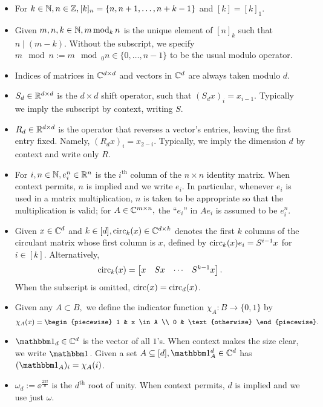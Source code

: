 \begin{itemize}
\item For $k \in \mathbb{N}, n \in \mathbb{Z}, [k]_n = \{n, n + 1, \ldots, n + k - 1\}$ and $[k] = [k]_1$.
\item Given $m, n, k \in \mathbb{N}, m \operatorname{\mathbin{mod}}_k n$ is the unique element of $[n]_k$ such that $n \mid (m - k)$.  Without the subscript, we specify $m \mod n := m \mod_0 n \in \{0, \ldots, n - 1\}$ to be the usual modulo operator.
\item Indices of matrices in $\mathbb{C}^{d \times d}$ and vectors in $\mathbb{C}^d$ are always taken modulo $d$.
\item $S_d \in \mathbb{R}^{d \times d}$ is the $d \times d$ shift operator, such that $(S_d x)_i = x_{i - 1}$.  Typically we imply the subscript by context, writing $S$.
\item $R_d \in \mathbb{R}^{d \times d}$ is the operator that reverses a vector's entries, leaving the first entry fixed.  Namely, $(R_d x)_i = x_{2 - i}$.  Typically, we imply the dimension $d$ by context and write only $R$.
\item For $i, n \in \mathbb{N}, e_i^n \in \mathbb{R}^n$ is the $i^{\text{th}}$ column of the $n \times n$ identity matrix.  When context permits, $n$ is implied and we write $e_i$.  In particular, whenever $e_i$ is used in a matrix multiplication, $n$ is taken to be appropriate so that the multiplication is valid; for $A \in \mathbb{C}^{m \times n},$ the ``$e_i$'' in $A e_i$ is assumed to be $e_i^n$.
\item Given $x \in \mathbb{C}^d$ and $k \in [d], \operatorname{circ}_k(x) \in \mathbb{C}^{d \times k}$ denotes the first $k$ columns of the circulant matrix whose first column is $x$, defined by $\operatorname{circ}_k(x) e_i = S^{i - 1} x$ for $i \in [k]$.  Alternatively, \[\operatorname{circ}_k(x) = \begin{bmatrix} x & S x & \cdots & S^{k-1} x \end{bmatrix}.\]  When the subscript is omitted, $\operatorname{circ}(x) = \operatorname{circ}_d(x)$.
  \item Given any $A \subset B,$ we define the indicator function $\chi_A : B \to \{0, 1\}$ by \[\chi_A(x) = \begin{piecewise} 1 & x \in A \\ 0 & \text{otherwise} \end{piecewise}.\]
  \item $\one_d \in \C^d$ is the vector of all $1$'s.  When context makes the size clear, we write $\one$.  Given a set $A \subset [d], \one_A^d \in \C^d$ has $(\one_A)_i = \chi_A(i)$.
\item $\omega_d := \ee^{\frac{2 \pi \ii}{d}}$ is the $d^{\text{th}}$ root of unity.  When context permits, $d$ is implied and we use just $\omega$.

\end{itemize}
